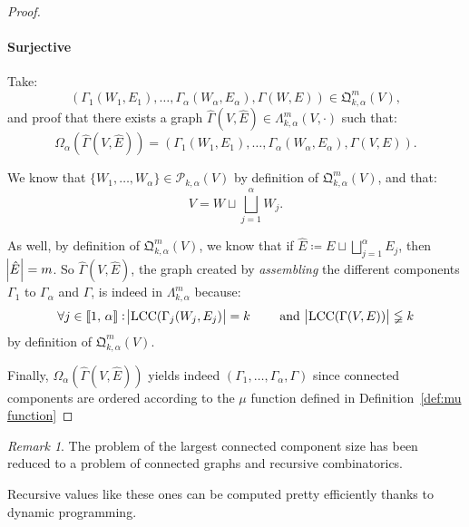 \documentclass{article}
\theoremstyle{definition}
\theoremstyle{remark}
\newtheorem*{remark}{Remark}
\DeclareMathOperator{\LCC}{LCC}
\newcommand{\intint}[2]{\left\llbracket#1, \, #2\right\rrbracket}
\begin{document}
\begin{proof}
			\paragraph{Surjective} Take:
			\[\left(\Gamma_1(W_1, E_1), \ldots, \Gamma_\alpha(W_\alpha, E_\alpha), \Gamma(W, E)\right) \in \mathfrak Q_{k,\alpha}^m(V),\]
			and proof that there exists a graph $\hat \Gamma(V, \hat E) \in \Lambda_{k,\alpha}^m(V, \cdot)$ such that:
			\[\Omega_\alpha(\hat \Gamma(V, \hat E)) = \left(\Gamma_1(W_1, E_1), \ldots, \Gamma_\alpha(W_\alpha, E_\alpha), \Gamma(V, E)\right).\]

			We know that $\{W_1, \ldots, W_\alpha\} \in \mathcal P_{k,\alpha}(V)$ by definition of $\mathfrak Q_{k,\alpha}^m(V)$, and that:
			\[V = W \sqcup \bigsqcup_{j=1}^\alpha W_j.\]

			As well, by definition of $\mathfrak Q_{k,\alpha}^m(V)$, we know that if $\hat E \coloneqq E \sqcup \bigsqcup_{j=1}^\alpha E_j$, then $\abs {\hat E} = m$.
			So $\hat \Gamma(V, \hat E)$, the graph created by \textit{assembling} the different components $\Gamma_1$ to $\Gamma_\alpha$ and $\Gamma$, is indeed in
			$\Lambda_{k,\alpha}^m$ because:
			\[\forall j \in \intint 1\alpha : \abs {\LCC(\Gamma_j(W_j, E_j)} = k\qquad \text{ and } \abs {\LCC(\Gamma(V, E))} \lneqq k\]
			by definition of $\mathfrak Q_{k,\alpha}^m(V)$.

			Finally, $\Omega_\alpha(\hat \Gamma(V, \hat E))$ yields indeed $(\Gamma_1, \ldots, \Gamma_\alpha, \Gamma)$ since connected components are ordered according
			to the $\mu$ function defined in Definition~\ref{def:mu function}
			\end{proof}

			\begin{remark} The problem of the largest connected component size has been reduced to a problem of connected graphs and recursive combinatorics.

			Recursive values like these ones can be computed pretty efficiently thanks to dynamic programming.
			\end{remark}
\end{document}
